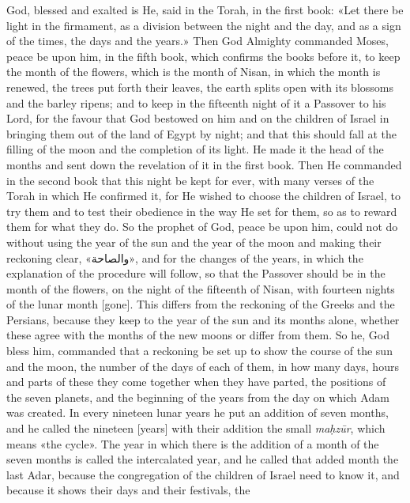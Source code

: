 \documentclass[11pt]{article}
\newcommand{\Pg}[1]{\marginpar{\footnotesize #1}}
\begin{document}
\Pg{pp. 2–3}God, blessed and exalted is He, said in the Torah, in the first book: «Let there be light in the firmament, as a division between the night and the day, and as a sign of the times, the days and the years.» Then God Almighty commanded Moses, peace be upon him, in the fifth book, which confirms the books before it, to keep the month of the flowers, which is the month of Nisan, in which the month is renewed, the trees put forth their leaves, the earth splits open with its blossoms and the barley ripens; and to keep in the fifteenth night of it a Passover to his Lord, for the favour that God bestowed on him and on the children of Israel in bringing them out of the land of Egypt by night; and that this should fall at the filling of the moon and the completion of its light. He made it the head of the months and sent down the revelation of it in the first book. Then He commanded in the second book that this night be kept for ever, with many verses of the Torah in which He confirmed it, for He wished to choose the children of Israel, to try them and to test their obedience in the way He set for them, so as to reward them for what they do. So the prophet of God, peace be upon him, could not do without using the year of the sun and the year of the moon and making their reckoning clear, «\textarabic{والصاحة}», and for the changes of the years, in which the explanation of the procedure will follow, so that the Passover should be in the month of the flowers, on the night of the fifteenth of Nisan, with fourteen nights of the lunar month [gone]. This differs from the reckoning of the Greeks and the Persians, because they keep to the year of the sun and its months alone, whether these agree with the months of the new moons or differ from them. So he, God bless him, commanded that a reckoning be set up to show the course of the sun and the moon, the number of the days of each of them, in how many days, hours and parts of these they come together when they have parted, the positions of the seven planets, and the beginning of the years from the day on which Adam was created. In every nineteen lunar years he put an addition of seven months, and he called the nineteen [years] with their addition the small \textit{maḥzūr}, which means «the cycle». The year in which there is the addition of a month of the seven months is called the intercalated year, and he called that added month the last Adar, because the congregation of the children of Israel need to know it, and because it shows their days and their festivals, the 
\end{document}
